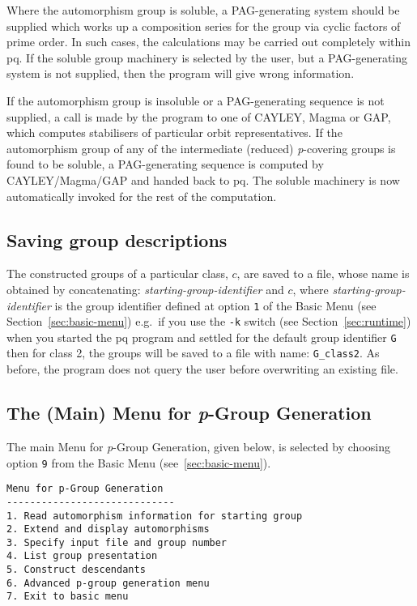 \documentclass[12pt]{article}
\begin{document}
Where the automorphism group is soluble, a PAG-generating system should 
be supplied which works up a composition series for the group via 
cyclic factors of prime order. In such cases, the calculations may be
carried out completely within pq.  If the soluble 
group machinery is selected by the user, but a PAG-generating system is 
not supplied, then the program will give wrong information.

If the automorphism group is insoluble or a PAG-generating sequence 
is not supplied, a call is made by the program to one of 
CAYLEY, {\sc Magma} or {\sf GAP}, which computes stabilisers of particular 
orbit representatives.
If the automorphism group of any of the intermediate (reduced) 
{\it p}-covering groups is found to be soluble, a PAG-generating sequence 
is computed by CAYLEY/{\sc Magma}/{\sf GAP} and handed back to pq.  The soluble machinery 
is now automatically invoked for the rest of the computation.

\subsection{Saving group descriptions}
The constructed groups of a particular class, $c$, are saved to a file,
whose name is obtained by concatenating: 
\textit{starting-group-identifier} and $c$, where
\textit{starting-group-identifier} is the group identifier defined at option
\texttt{1} of the Basic Menu (see Section~\ref{sec:basic-menu})
e.g.~if you use the \texttt{-k} switch (see Section~\ref{sec:runtime})
when you started the pq program and settled for the default group identifier
\texttt{G} then for class 2, the groups will be saved to a file with name:
\texttt{G\_class2}. As before, the 
program does not query the user before overwriting an existing file.

\subsection{The (Main) Menu for {\it p}-Group Generation}
\label{sec:pgrp-gen-main-menu}
The main Menu for {\it p}-Group Generation, given below, is selected by
choosing option \texttt{9} from the Basic Menu (see~\ref{sec:basic-menu}).
\pagebreak
\begin{verbatim}
Menu for p-Group Generation
-----------------------------
1. Read automorphism information for starting group
2. Extend and display automorphisms
3. Specify input file and group number
4. List group presentation
5. Construct descendants
6. Advanced p-group generation menu
7. Exit to basic menu
\end{verbatim}
\end{document}
